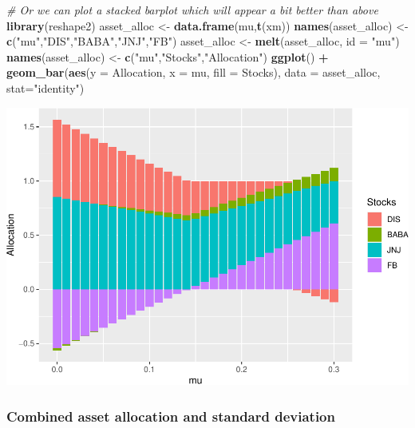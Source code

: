 \documentclass[]{article}
\newenvironment{Shaded}{\begin{snugshade}}{\end{snugshade}}
\newcommand{\KeywordTok}[1]{\textcolor[rgb]{0.13,0.29,0.53}{\textbf{#1}}}
\newcommand{\DataTypeTok}[1]{\textcolor[rgb]{0.13,0.29,0.53}{#1}}
\newcommand{\StringTok}[1]{\textcolor[rgb]{0.31,0.60,0.02}{#1}}
\newcommand{\CommentTok}[1]{\textcolor[rgb]{0.56,0.35,0.01}{\textit{#1}}}
\newcommand{\OperatorTok}[1]{\textcolor[rgb]{0.81,0.36,0.00}{\textbf{#1}}}
\newcommand{\NormalTok}[1]{#1}
\begin{document}
\begin{Shaded}
\begin{Highlighting}[]
\CommentTok{# Or we can plot a stacked barplot which will appear a bit better than above}
\KeywordTok{library}\NormalTok{(reshape2)}
\NormalTok{asset_alloc <-}\StringTok{ }\KeywordTok{data.frame}\NormalTok{(mu,}\KeywordTok{t}\NormalTok{(xm))}
\KeywordTok{names}\NormalTok{(asset_alloc) <-}\StringTok{ }\KeywordTok{c}\NormalTok{(}\StringTok{"mu"}\NormalTok{,}\StringTok{"DIS"}\NormalTok{,}\StringTok{"BABA"}\NormalTok{,}\StringTok{"JNJ"}\NormalTok{,}\StringTok{"FB"}\NormalTok{)}
\NormalTok{asset_alloc <-}\StringTok{ }\KeywordTok{melt}\NormalTok{(asset_alloc, }\DataTypeTok{id =} \StringTok{"mu"}\NormalTok{)}
\KeywordTok{names}\NormalTok{(asset_alloc) <-}\StringTok{ }\KeywordTok{c}\NormalTok{(}\StringTok{"mu"}\NormalTok{,}\StringTok{"Stocks"}\NormalTok{,}\StringTok{"Allocation"}\NormalTok{)}
\KeywordTok{ggplot}\NormalTok{() }\OperatorTok{+}\StringTok{ }\KeywordTok{geom_bar}\NormalTok{(}\KeywordTok{aes}\NormalTok{(}\DataTypeTok{y =}\NormalTok{ Allocation, }\DataTypeTok{x =}\NormalTok{ mu, }\DataTypeTok{fill =}\NormalTok{ Stocks), }\DataTypeTok{data =}\NormalTok{ asset_alloc, }\DataTypeTok{stat=}\StringTok{"identity"}\NormalTok{) }
\end{Highlighting}
\end{Shaded}

\includegraphics{Markowitz_Research_Me_files/figure-latex/unnamed-chunk-16-2.pdf}

\subsubsection{Combined asset allocation and standard
deviation}\label{combined-asset-allocation-and-standard-deviation}
\end{document}
